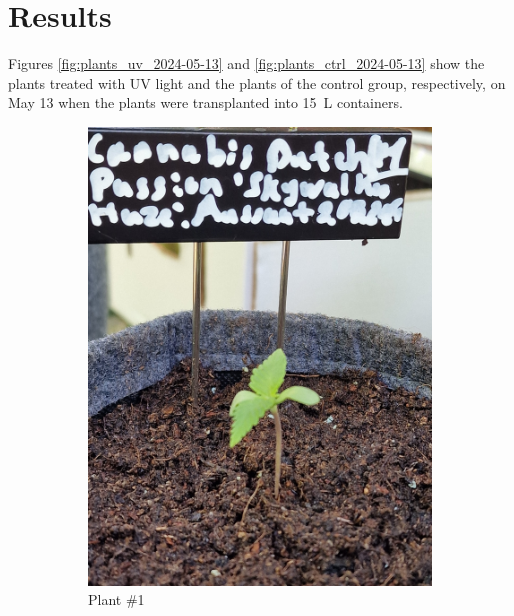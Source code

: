 \section{Results}

Figures \ref{fig:plants_uv_2024-05-13} and \ref{fig:plants_ctrl_2024-05-13} show the plants treated with UV light and the plants of the control group, respectively, on May 13 when the plants were transplanted into \qty[mode=text]{15}{\L} containers.

\begin{figure}[H]
    \begin{subfigure}[t]{.19\textwidth}
        \includegraphics[width=\linewidth]{plant_01_2024-05-13}
        \caption{Plant \#1}
        \label{fig:plant_01_2024-05-13}
    \end{subfigure}
    \hfill
    \begin{subfigure}[t]{.19\textwidth}

\end{subfigure}
\end{figure}
